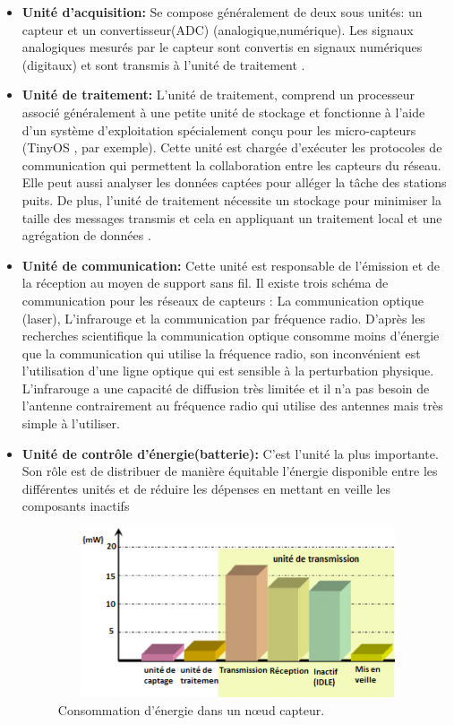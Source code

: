 \begin{itemize}
  \item \textbf{Unité d’acquisition: }Se compose généralement de deux sous unités: un capteur et un convertisseur(ADC) (analogique,numérique).
Les signaux analogiques mesurés par le capteur sont convertis en signaux numériques (digitaux) et sont transmis à l’unité de traitement \cite{mekidicheetude}.
 
  \item \textbf{Unité de traitement: }L’unité de traitement, comprend un processeur associé généralement à une petite unité de stockage et fonctionne à l’aide d’un système d’exploitation spécialement conçu pour les micro-capteurs (TinyOS \cite{hill2000system}, par exemple). Cette unité est chargée d’exécuter les protocoles de communication qui permettent la collaboration entre les capteurs du réseau. Elle peut aussi analyser les données captées pour alléger la tâche des stations puits. De plus, l’unité de traitement nécessite un stockage pour minimiser la taille des messages transmis et cela en appliquant un traitement local et une agrégation de données \cite{feng2002system}.
	\item \textbf{Unité de communication: }Cette unité est responsable de l’émission et de la réception au moyen de support sans fil. Il existe trois schéma de communication pour les réseaux de capteurs : La communication optique (laser), L’infrarouge et la communication par fréquence radio. D’après les recherches scientifique la communication optique consomme moins d’énergie que la communication qui utilise la fréquence radio, son inconvénient est l’utilisation  d’une ligne optique qui est sensible à la perturbation physique. L’infrarouge a une capacité de diffusion très limitée et il n’a pas besoin de l’antenne contrairement au fréquence radio qui utilise des antennes mais très simple à l’utiliser.
	\item \textbf{Unité de contrôle d’énergie(batterie): }C’est l’unité la plus importante. Son rôle est de distribuer de manière équitable l'énergie disponible entre les différentes unités et de réduire les dépenses en mettant en veille les composants inactifs\\
\begin{figure}[H]
	\centering
	\includegraphics[width=14cm,height=5cm]{Chap1/4.png}
	\caption{Consommation d’énergie dans un nœud capteur. \cite{raghunathan2005design,karl2007protocols}}
	\label{fig:CENC}
\end{figure}


\end{itemize}

